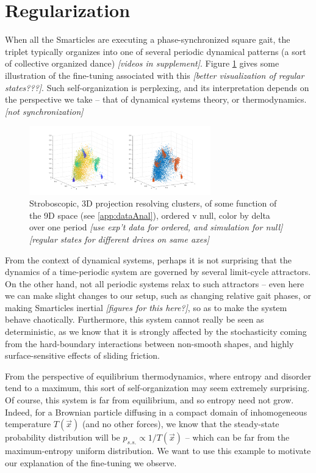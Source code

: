 \documentclass[11pt]{article}
\renewcommand{\v}[1]{\ensuremath{\vec{#1}}} %
\renewcommand{\=}[1]{\stackrel{#1}{=}} %
\renewcommand{\(}{\left (}
\renewcommand{\)}{\right  )}
\renewcommand{\[}{\left [}
\renewcommand{\]}{\right ]}
\newcommand{\<}{\left <}
\renewcommand{\>}{\right >}
\theoremstyle{definition}
\theoremstyle{remark}
\renewcommand{\todo}[1]{\textit{\color{red}[#1]}}
\begin{document}
\section{Regularization}
When all the Smarticles are executing a phase-synchronized square gait, the triplet typically organizes into one of several periodic dynamical patterns (a sort of collective organized dance) \todo{videos in supplement}. Figure \ref{fig:configSpace} gives some illustration of the fine-tuning associated with this \todo{better visualization of regular states???}. Such self-organization is perplexing, and its interpretation depends on the perspective we take -- that of dynamical systems theory, or thermodynamics.
\todo{not synchronization}

\begin{figure}
	\includegraphics[width=0.7\textwidth]{scatter_FT.pdf}
	\caption{Stroboscopic, 3D projection resolving clusters, of some function of the 9D space (see \ref{app:dataAnal}), ordered v null, color by delta over one period \todo{use exp't data for ordered, and simulation for null}
	\todo{regular states for different drives on same axes}}
	\label{fig:configSpace}
\end{figure}

From the context of dynamical systems, perhaps it is not surprising that the dynamics of a time-periodic system are governed by several limit-cycle attractors. On the other hand, not all periodic systems relax to such attractors -- even here we can make slight changes to our setup, such as changing relative gait phases, or making Smarticles inertial \todo{figures for this here?}, so as to make the system behave chaotically. Furthermore, this system cannot really be seen as deterministic, as we know that it is strongly affected by the stochasticity coming from the hard-boundary interactions between non-smooth shapes, and highly surface-sensitive effects of sliding friction.

From the perspective of equilibrium thermodynamics, where entropy and disorder tend to a maximum, this sort of self-organization may seem extremely surprising. Of course, this system is far from equilibrium, and so entropy need not grow. Indeed, for a Brownian particle diffusing in a compact domain of inhomogeneous temperature $ T(\v{x}) $ (and no other forces), we know that the steady-state probability distribution will be $ p_{s.s.} \propto 1/T(\v{x}) $ -- which can be far from the maximum-entropy uniform distribution. We want to use this example to motivate our explanation of the fine-tuning we observe.
\end{document}
